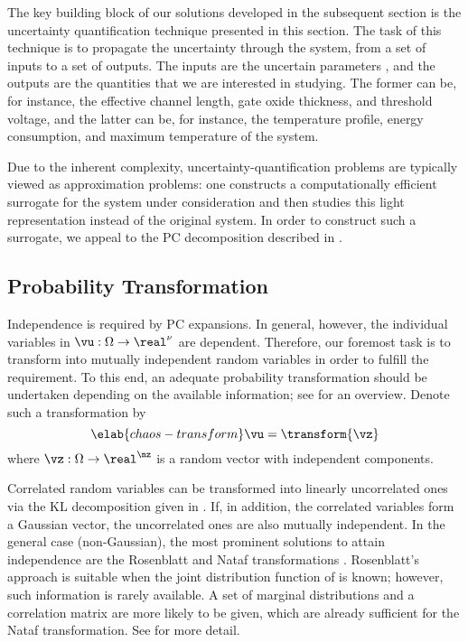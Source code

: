The key building block of our solutions developed in the subsequent section is
the uncertainty quantification technique presented in this section. The task of
this technique is to propagate the uncertainty through the system, from a set of
inputs to a set of outputs. The inputs are the uncertain parameters \vu, and the
outputs are the quantities that we are interested in studying. The former can
be, for instance, the effective channel length, gate oxide thickness, and
threshold voltage, and the latter can be, for instance, the temperature profile,
energy consumption, and maximum temperature of the system.

Due to the inherent complexity, uncertainty-quantification problems are
typically viewed as approximation problems: one constructs a computationally
efficient surrogate for the system under consideration and then studies this
light representation instead of the original system. In order to construct such
a surrogate, we appeal to the \ac{PC} decomposition described in
.

\subsection{Probability Transformation}

Independence is required by \ac{PC} expansions. In general, however, the \nu
individual variables in $\vu: \Omega \to \real^\nu$ are dependent. Therefore,
our foremost task is to transform \vu into mutually independent random variables
in order to fulfill the requirement. To this end, an adequate probability
transformation should be undertaken depending on the available information; see
\cite{eldred2008} for an overview. Denote such a transformation by
\begin{equation} \elab{chaos-transform}
  \vu = \transform{\vz}
\end{equation}
where $\vz: \Omega \to \real^\nz$ is a random vector with \nz independent
components.

Correlated random variables can be transformed into linearly uncorrelated ones
via the \ac{KL} decomposition given in . If, in addition,
the correlated variables form a Gaussian vector, the uncorrelated ones are also
mutually independent. In the general case (non-Gaussian), the most prominent
solutions to attain independence are the Rosenblatt \cite{rosenblatt1952} and
Nataf transformations \cite{liu1986}. Rosenblatt's approach is suitable when the
joint distribution function of \vu is known; however, such information is rarely
available. A set of marginal distributions and a correlation matrix are more
likely to be given, which are already sufficient for the Nataf transformation.
See  for more detail.

